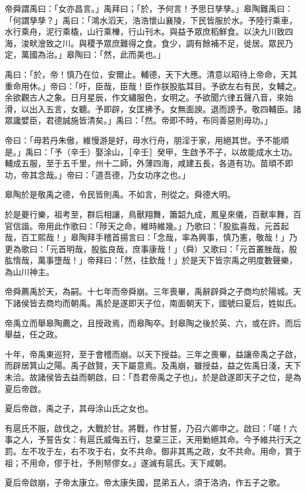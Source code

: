 \begin{pinyinscope}
帝舜謂禹曰：「女亦昌言。」禹拜曰；「於，予何言！予思日孳孳。」皋陶難禹曰：「何謂孳孳？」禹曰：「鴻水滔天，浩浩懷山襄陵，下民皆服於水。予陸行乘車，水行乘舟，泥行乘橇，山行乘檋，行山刊木。與益予眾庶稻鮮食。以決九川致四海，浚畎澮致之川。與稷予眾庶難得之食。食少，調有餘補不足，徙居。眾民乃定，萬國為治。」皋陶曰：「然，此而美也。」

禹曰：「於，帝！慎乃在位，安爾止。輔德，天下大應。清意以昭待上帝命，天其重命用休。」帝曰：「吁，臣哉，臣哉！臣作朕股肱耳目。予欲左右有民，女輔之。余欲觀古人之象。日月星辰，作文繡服色，女明之。予欲聞六律五聲八音，來始滑，以出入五言，女聽。予即辟，女匡拂予。女無面諛。退而謗予。敬四輔臣。諸眾讒嬖臣，君德誠施皆清矣。」禹曰：「然。帝即不時，布同善惡則毋功。」

帝曰：「毋若丹朱傲，維慢游是好，毋水行舟，朋淫于家，用絕其世。予不能順是。」禹曰：「予（辛壬）娶涂山，［辛壬］癸甲，生啟予不子，以故能成水土功。輔成五服，至于五千里，州十二師，外薄四海，咸建五長，各道有功。苗頑不即功，帝其念哉。」帝曰：「道吾德，乃女功序之也。」

皋陶於是敬禹之德，令民皆則禹。不如言，刑從之。舜德大明。

於是夔行樂，祖考至，群后相讓，鳥獸翔舞，簫韶九成，鳳皇來儀，百獸率舞，百官信諧。帝用此作歌曰：「陟天之命，維時維幾。」乃歌曰：「股肱喜哉，元首起哉，百工熙哉！」皋陶拜手稽首揚言曰：「念哉，率為興事，慎乃憲，敬哉！」乃更為歌曰：「元首明哉，股肱良哉，庶事康哉！」（舜）又歌曰：「元首叢脞哉，股肱惰哉，萬事墮哉！」帝拜曰：「然，往欽哉！」於是天下皆宗禹之明度數聲樂，為山川神主。

帝舜薦禹於天，為嗣。十七年而帝舜崩。三年喪畢，禹辭辟舜之子商均於陽城。天下諸侯皆去商均而朝禹。禹於是遂即天子位，南面朝天下，國號曰夏后，姓姒氏。

帝禹立而舉皋陶薦之，且授政焉，而皋陶卒。封皋陶之後於英、六，或在許。而后舉益，任之政。

十年，帝禹東巡狩，至于會稽而崩。以天下授益。三年之喪畢，益讓帝禹之子啟，而辟居箕山之陽。禹子啟賢，天下屬意焉。及禹崩，雖授益，益之佐禹日淺，天下未洽。故諸侯皆去益而朝啟，曰：「吾君帝禹之子也」。於是啟遂即天子之位，是為夏后帝啟。

夏后帝啟，禹之子，其母涂山氏之女也。

有扈氏不服，啟伐之，大戰於甘。將戰，作甘誓，乃召六卿申之。啟曰：「嗟！六事之人，予誓告女：有扈氏威侮五行，怠棄三正，天用勦絕其命。今予維共行天之罰。左不攻于左，右不攻于右，女不共命。御非其馬之政，女不共命。用命，賞于祖；不用命，僇于社，予則帑僇女。」遂滅有扈氏。天下咸朝。

夏后帝啟崩，子帝太康立。帝太康失國，昆弟五人，須于洛汭，作五子之歌。


\end{pinyinscope}
